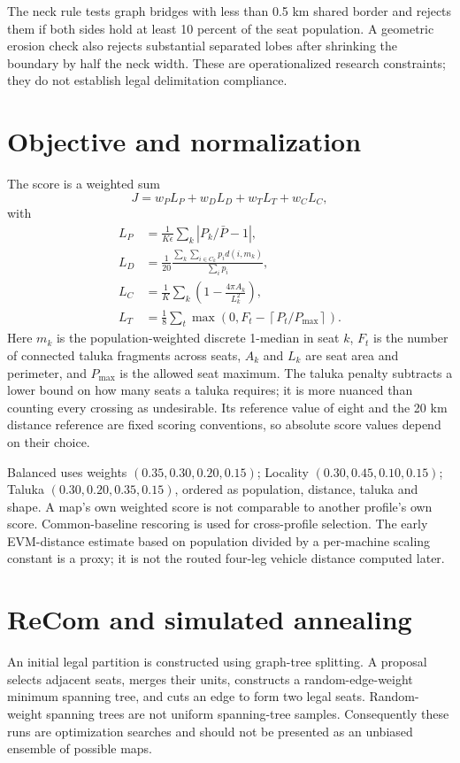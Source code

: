 \documentclass[11pt,a4paper,oneside]{report}
\newcommand{\source}[1]{\par\nopagebreak[4]{\footnotesize\color{teal}Evidence: #1.}\par}
\begin{document}
The neck rule tests graph bridges with less than 0.5 km shared border and rejects them if both sides hold at least 10 percent of the seat population. A geometric erosion check also rejects substantial separated lobes after shrinking the boundary by half the neck width. These are operationalized research constraints; they do not establish legal delimitation compliance.
\source{[S2]}

\section{Objective and normalization}
The score is a weighted sum
\begin{equation}\label{eq:score}
 J=w_P L_P+w_D L_D+w_T L_T+w_C L_C,
\end{equation}
with
\begin{align}
 L_P&=\frac{1}{K\epsilon}\sum_k\left|P_k/\bar P-1\right|,\\
 L_D&=\frac{1}{20}\frac{\sum_k\sum_{i\in C_k}p_i d(i,m_k)}{\sum_i p_i},\\
 L_C&=\frac1K\sum_k\left(1-\frac{4\pi A_k}{L_k^2}\right),\\
 L_T&=\frac18\sum_t\max\left(0,F_t-\left\lceil P_t/P_{\max}\right\rceil\right).
\end{align}
Here $m_k$ is the population-weighted discrete 1-median in seat $k$, $F_t$ is the number of connected taluka fragments across seats, $A_k$ and $L_k$ are seat area and perimeter, and $P_{\max}$ is the allowed seat maximum. The taluka penalty subtracts a lower bound on how many seats a taluka requires; it is more nuanced than counting every crossing as undesirable. Its reference value of eight and the 20 km distance reference are fixed scoring conventions, so absolute score values depend on their choice.

Balanced uses weights $(0.35,0.30,0.20,0.15)$; Locality $(0.30,0.45,0.10,0.15)$; Taluka $(0.30,0.20,0.35,0.15)$, ordered as population, distance, taluka and shape. A map's own weighted score is not comparable to another profile's own score. Common-baseline rescoring is used for cross-profile selection. The early EVM-distance estimate based on population divided by a per-machine scaling constant is a proxy; it is not the routed four-leg vehicle distance computed later.
\source{[S2], [S5]}

\section{ReCom and simulated annealing}
An initial legal partition is constructed using graph-tree splitting. A proposal selects adjacent seats, merges their units, constructs a random-edge-weight minimum spanning tree, and cuts an edge to form two legal seats. Random-weight spanning trees are not uniform spanning-tree samples. Consequently these runs are optimization searches and should not be presented as an unbiased ensemble of possible maps.
\end{document}
